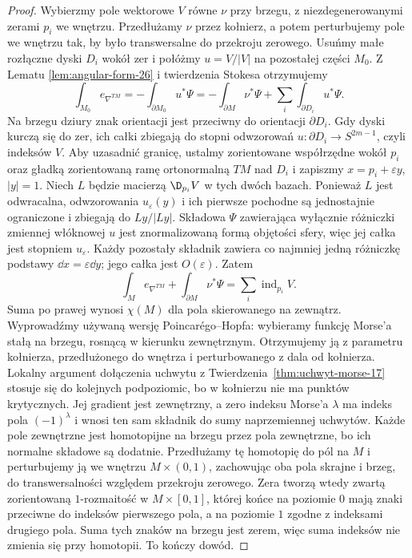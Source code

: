 \begin{proof}
Wybierzmy pole wektorowe $V$
równe $\nu$ przy brzegu,
z niezdegenerowanymi zerami $p_i$
we wnętrzu. Przedłużamy
$\nu$ przez kołnierz,
a potem perturbujemy pole
we wnętrzu tak, by było transwersalne
do przekroju zerowego. Usuńmy małe
rozłączne dyski $D_i$
wokół zer i połóżmy
$u=V/|V|$ na pozostałej
części $M_0$. Z Lematu
\ref{lem:angular-form-26}
i twierdzenia Stokesa
otrzymujemy
\[
 \int_{M_0}e_{\nabla^{TM}}
 =-\int_{\partial M_0}u^*\Psi
 =-\int_{\partial M}\nu^*\Psi
   +\sum_i\int_{\partial D_i}u^*\Psi.
\]
Na brzegu dziury znak orientacji
jest przeciwny do orientacji
$\partial D_i$. Gdy dyski
kurczą się do zer, ich
całki zbiegają do stopni
odwzorowań
$u:\partial D_i\to S^{2m-1}$,
czyli indeksów $V$. Aby uzasadnić granicę,
ustalmy zorientowane współrzędne wokół $p_i$
oraz gładką zorientowaną ramę ortonormalną
$TM$ nad $D_i$ i zapiszmy
$x=p_i+\varepsilon y$, $|y|=1$.
Niech $L$ będzie macierzą $\D_{p_i}V$
w tych dwóch bazach. Ponieważ $L$ jest odwracalna,
odwzorowania $u_\varepsilon(y)$ i ich pierwsze
pochodne są jednostajnie ograniczone i zbiegają
do $Ly/|Ly|$.
Składowa $\Psi$ zawierająca wyłącznie różniczki
zmiennej włóknowej $u$ jest znormalizowaną
formą objętości sfery, więc jej całka jest
stopniem $u_\varepsilon$. Każdy pozostały
składnik zawiera co najmniej jedną różniczkę
podstawy $\dd x=\varepsilon\dd y$; jego
całka jest $O(\varepsilon)$.
Zatem
\[
 \int_M e_{\nabla^{TM}}
 +\int_{\partial M}\nu^*\Psi
 =\sum_i\operatorname{ind}_{p_i}V.
\]
Suma po prawej wynosi
$\chi(M)$ dla pola
skierowanego na zewnątrz.
Wyprowadźmy używaną
wersję Poincarégo--Hopfa:
wybieramy funkcję Morse'a
stałą na brzegu, rosnącą
w kierunku zewnętrznym.
Otrzymujemy ją z parametru kołnierza,
przedłużonego do wnętrza i perturbowanego
z dala od kołnierza. Lokalny argument
dołączenia uchwytu z
Twierdzenia~\ref{thm:uchwyt-morse-17}
stosuje się do kolejnych podpoziomic,
bo w kołnierzu nie ma punktów krytycznych.
Jej gradient jest zewnętrzny,
a zero indeksu Morse'a
$\lambda$ ma indeks pola
$(-1)^\lambda$ i wnosi
ten sam składnik do sumy
naprzemiennej uchwytów.
Każde pole zewnętrzne
jest homotopijne na brzegu
przez pola zewnętrzne,
bo ich normalne składowe
są dodatnie. Przedłużamy tę homotopię
do pól na $M$ i perturbujemy ją
we wnętrzu $M\times(0,1)$,
zachowując oba pola skrajne i brzeg,
do transwersalności
względem przekroju zerowego.
Zera tworzą wtedy zwartą zorientowaną
$1$-rozmaitość w $M\times[0,1]$,
której końce na poziomie $0$ mają
znaki przeciwne do indeksów pierwszego
pola, a na poziomie $1$ zgodne
z indeksami drugiego pola.
Suma tych znaków na brzegu jest zerem,
więc suma indeksów nie zmienia się
przy homotopii. To kończy dowód.
\end{proof}

